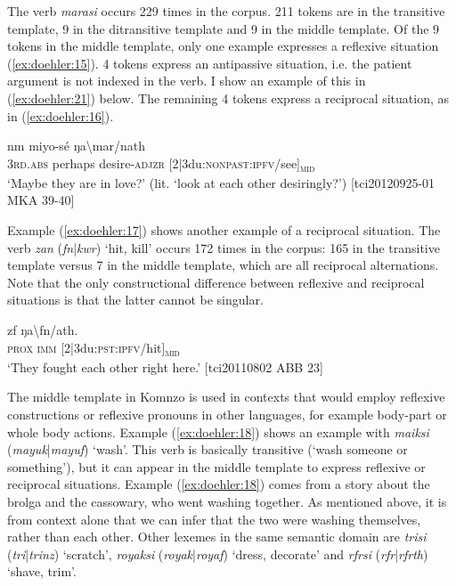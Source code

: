 \documentclass[output=paper]{langscibook}
\begin{document}
\z


The verb \emph{marasi} occurs 229 times in the corpus. 211 tokens are in the transitive template, 9 in the ditransitive template and 9 in the middle template. Of the 9 tokens in the middle template, only one example expresses a reflexive situation (\ref{ex:doehler:15}). 4 tokens express an antipassive situation, i.e. the patient argument is not indexed in the verb. I show an example of this in (\ref{ex:doehler:21}) below. The remaining 4 tokens express a reciprocal situation, as in (\ref{ex:doehler:16}).


\ea
	 {nm} {miyo-sé} {ŋa\textbackslash{mar}/nath}\\
	\textsc{3rd}.\textsc{abs}{} perhaps desire-\textsc{adjzr}{} [2|3du:\textsc{nonpast}:\textsc{ipfv}/see]\textsubscript{\textsc{mid}}\\
	\glt `Maybe they are in love?' (lit. `look at each other desiringly?') [tci20120925-01 MKA 39-40]
	\label{ex:doehler:16}
\z


Example (\ref{ex:doehler:17}) shows another example of a reciprocal situation. The verb \emph{zan} (\emph{fn}|\emph{kwr}) `hit, kill' occurs 172 times in the corpus: 165 in the transitive template versus 7 in the middle template, which are all reciprocal alternations. Note that the only constructional difference between reflexive and reciprocal situations is that the latter cannot be singular.

\ea
	\label{ex:doehler:17}%
	 {zf} {ŋa\textbackslash{fn}/ath}.\\
	\textsc{prox}{} \textsc{imm}{} [2|3du:\textsc{pst}:\textsc{ipfv}/hit]\textsubscript{\textsc{mid}}\\
	\glt `They fought each other right here.' [tci20110802 ABB 23] %
\z


The middle template in Komnzo is used in contexts that would employ reflexive constructions or reflexive pronouns in other languages, for example body-part or whole body actions. Example (\ref{ex:doehler:18}) shows an example with \emph{maiksi} (\emph{mayuk}|\emph{mayuf}) `wash'. This verb is basically transitive (`wash someone or something'), but it can appear in the middle template to express reflexive or reciprocal situations. Example (\ref{ex:doehler:18}) comes from a story about the brolga and the cassowary, who went washing together. As mentioned above, it is from context alone that we can infer that the two were washing themselves, rather than each other. Other lexemes in the same semantic domain are \emph{trisi} (\emph{tri}|\emph{trinz}) `scratch', \emph{royaksi} (\emph{royak}|\emph{royaf}) `dress, decorate' and \emph{rfrsi} (\emph{rfr}|\emph{rfrth}) `shave, trim'. 
\end{document}
